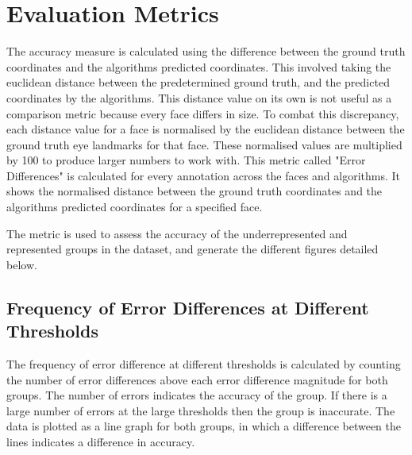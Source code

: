 \documentclass{l4proj}
\begin{document}
\section{Evaluation Metrics}
\label{experimentaldesign}

The accuracy measure is calculated using the difference between the ground truth coordinates and the algorithms predicted coordinates. This involved taking the euclidean distance between the predetermined ground truth, and the predicted coordinates by the algorithms. This distance value on its own is not useful as a comparison metric because every face differs in size. To combat this discrepancy, each distance value for a face is normalised by the euclidean distance between the ground truth eye landmarks for that face. These normalised values are multiplied by 100 to produce larger numbers to work with. This metric called "Error Differences" is calculated for every annotation across the faces and algorithms. It shows the normalised distance between the ground truth coordinates and the algorithms predicted coordinates for a specified face. 

The metric is used to assess the accuracy of the underrepresented and represented groups in the dataset, and generate the different figures detailed below.
\subsection{Frequency of Error Differences at Different Thresholds}
The frequency of error difference at different thresholds is calculated by counting the number of error differences above each error difference magnitude for both groups. The number of errors indicates the accuracy of the group. If there is a large number of errors at the large thresholds then the group is inaccurate. The data is plotted as a line graph for both groups, in which a difference between the lines indicates a difference in accuracy.

\end{document}
